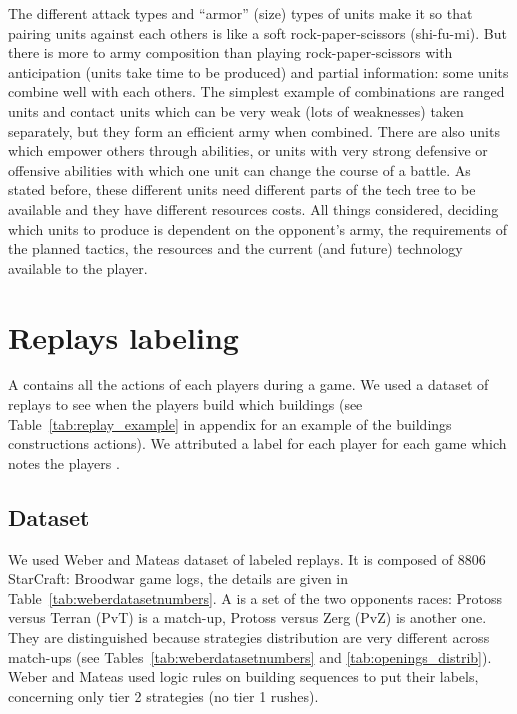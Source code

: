 The different attack types and ``armor'' (size) types of units make it so that pairing units against each others is like a soft rock-paper-scissors (shi-fu-mi). But there is more to army composition than playing rock-paper-scissors with anticipation (units take time to be produced) and partial information: some units combine well with each others. The simplest example of combinations are ranged units and contact units which can be very weak (lots of weaknesses) taken separately, but they form an efficient army when combined. There are also units which empower others through abilities, or units with very strong defensive or offensive abilities with which one unit can change the course of a battle. As stated before, these different units need different parts of the tech tree to be available and they have different resources costs. All things considered, deciding which units to produce is dependent on the opponent's army, the requirements of the planned tactics, the resources and the current (and future) technology available to the player.

\section{Replays labeling}
\label{sec:replayslabeling}

A  contains all the actions of each players during a game. We used a dataset of replays to see when the players build which buildings (see Table~\ref{tab:replay_example} in appendix for an example of the buildings constructions actions). We attributed a label for each player for each game which notes the players .

\subsection{Dataset}

We used Weber and Mateas \citep{weberStrat} dataset of labeled replays. It is composed of 8806 StarCraft: Broodwar game logs, the details are given in Table~\ref{tab:weberdatasetnumbers}. A  is a set of the two opponents races: Protoss versus Terran (PvT) is a match-up, Protoss versus Zerg (PvZ) is another one. They are distinguished because strategies distribution are very different across match-ups (see Tables~\ref{tab:weberdatasetnumbers} and \ref{tab:openings_distrib}). Weber and Mateas used logic rules on building sequences to put their labels, concerning only tier 2 strategies (no tier 1 rushes).

